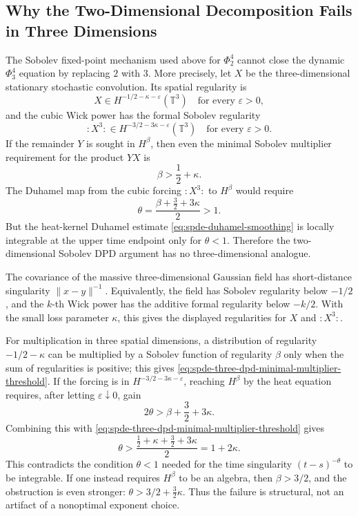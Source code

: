 \subsection{Why the Two-Dimensional Decomposition Fails in Three Dimensions}
\label{subsec:spde-dpd-three-dimensional-obstruction}

\begin{remark}
\label{rem:spde-sobolev-dpd-three-dimensional-obstruction}
The Sobolev fixed-point mechanism used above for \(\Phi^4_2\) cannot close
the dynamic \(\Phi^4_3\) equation by replacing \(2\) with \(3\).  More
precisely, let \(X\) be the three-dimensional stationary stochastic
convolution.  Its spatial regularity is
\[
  X\in H^{-1/2-\kappa-\varepsilon}(\mathbb T^3)
  \quad\text{for every }\varepsilon>0,
\]
and the cubic Wick power has the formal Sobolev regularity
\[
  :\!X^3\!:\in H^{-3/2-3\kappa-\varepsilon}(\mathbb T^3)
  \quad\text{for every }\varepsilon>0.
\]
If the remainder \(Y\) is sought in \(H^\beta\), then even the minimal
Sobolev multiplier requirement for the product \(YX\) is
\begin{equation}
  \beta>\frac12+\kappa .
  \label{eq:spde-three-dpd-minimal-multiplier-threshold}
\end{equation}
The Duhamel map from the cubic forcing
\(:\!X^3\!:\) to \(H^\beta\) would require
\begin{equation}
  \theta
  =
  \frac{\beta+\frac32+3\kappa}{2}>1 .
  \label{eq:spde-three-dpd-duhamel-obstruction}
\end{equation}
But the heat-kernel Duhamel estimate
\eqref{eq:spde-duhamel-smoothing} is locally integrable at the upper time
endpoint only for \(\theta<1\).  Therefore the two-dimensional Sobolev DPD
argument has no three-dimensional analogue.
\par
The covariance of the massive three-dimensional Gaussian field has
short-distance singularity \(\|x-y\|^{-1}\).  Equivalently, the field has
Sobolev regularity below \(-1/2\), and the \(k\)-th Wick power has the
additive formal regularity below \(-k/2\).  With the small loss parameter
\(\kappa\), this gives the displayed regularities for \(X\) and
\(:\!X^3\!:\).

For multiplication in three spatial dimensions, a distribution of regularity
\(-1/2-\kappa\) can be multiplied by a Sobolev function of regularity
\(\beta\) only when the sum of regularities is positive; this gives
\eqref{eq:spde-three-dpd-minimal-multiplier-threshold}.  If the forcing is
in \(H^{-3/2-3\kappa-\varepsilon}\), reaching \(H^\beta\) by the heat
equation requires, after letting \(\varepsilon\downarrow0\), gain
\[
  2\theta>\beta+\frac32+3\kappa .
\]
Combining this with
\eqref{eq:spde-three-dpd-minimal-multiplier-threshold} gives
\[
  \theta
  >
  \frac{\frac12+\kappa+\frac32+3\kappa}{2}
  =
  1+2\kappa .
\]
This contradicts the condition \(\theta<1\) needed for the time singularity
\((t-s)^{-\theta}\) to be integrable.  If one instead requires
\(H^\beta\) to be an algebra, then \(\beta>3/2\), and the obstruction is
even stronger:
\(\theta>3/2+\frac32\kappa\).  Thus the failure is structural, not an
artifact of a nonoptimal exponent choice.
\end{remark}

